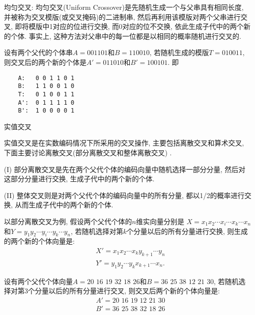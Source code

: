  均匀交叉: 均匀交叉(Uniform Crossover)是先随机生成一个与父串具有相同长度, 并被称为交叉模版(或交叉掩码)的二进制串, 然后再利用该模版对两个父串进行交叉, 即将模版中1对应的位进行交换, 而0对应的位不交换, 依此生成子代中的两个新的个体.
事实上, 这种方法对父串中的每一位都是以相同的概率随机进行交叉的.

\begin{example}
设有两个父代的个体串$A=001101$和$B=110010$, 若随机生成的模版$T=010011$, 则交叉后的两个新的个体是$A'=011010$和$B'=100101$. 即
\begin{center}
\begin{Verbatim}
    A:   0 0 1 1 0 1
    B:   1 1 0 0 1 0
    T:   0 1 0 0 1 1
    A':  0 1 1 1 1 0
    B':  1 0 0 0 0 1
\end{Verbatim}
\end{center}

     实值交叉
\end{example}

实值交叉是在实数编码情况下所采用的交叉操作, 主要包括离散交叉和算术交叉, 下面主要讨论离散交叉(部分离散交叉和整体离散交叉) .

(I) 部分离散交叉是先在两个父代个体的编码向量中随机选择一部分分量, 然后对这部分分量进行交换, 生成子代中的两个新的个体.

(II) 整体交叉则是对两个父代个体的编码向量中的所有分量, 都以1/2的概率进行交换, 从而生成子代中的两个新的个体.

以部分离散交叉为例, 假设两个父代个体的$n$维实向量分别是 $X=x_1x_2\cdots x_i\cdots x_k\cdots x_n$和$Y=y_1 y_2\cdots y_i \cdots y_k \cdots y_n$, 若随机选择对第$k$个分量以后的所有分量进行交换, 则生成的两个新的个体向量是:
\begin{align}
  &X'= x_1 x_2 \cdots x_k y_{k+1} \cdots y_n\\
  &Y'= y_1 y_2 \cdots y_k x_{k+1} \cdots x_n.
\end{align}

\begin{example}
设有两个父代个体向量$A=20\,\,  16\,\,  19\,\,  32 \,\, 18 \,\, 26$和$B=36\,\,  25\,\,  38\,\,  12\,\,  21\,\,  30$, 若随机选择对第3个分量以后的所有分量进行交叉, 则交叉后两个新的个体向量是:
\begin{align}
  &A'= 20\,\, 16\,\,  19\,\,  12\,\,  21\,\,  30\\
  &B'= 36\,\,  25\,\,  38\,\,  32\,\,  18\,\,  26
\end{align}

\end{example}

